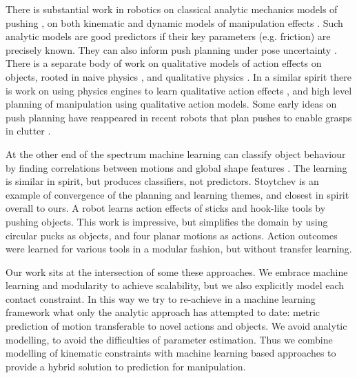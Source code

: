 There is substantial work in robotics on classical analytic mechanics models of pushing \cite{mason_manipulator_1982,lynch_mechanics_1992,peshkin_motion_1988,cappelleri_designing_2006}, on both kinematic and dynamic models of manipulation effects \cite{mason_mechanics_2001}. Such analytic models are good predictors if their key parameters (e.g. friction) are precisely known. They can also inform push planning under pose uncertainty \cite{brost1985planning}. There is a separate body of work on qualitative models of action effects on objects, rooted in naive physics \cite{hayes1995second}, and qualitative physics \cite{kuipers1986qualitative}. In a similar spirit there is work on using physics engines to learn qualitative action effects \cite{Mugan-tamd-12}, and high level planning of manipulation \cite{stillman08ijrr,roy2004mental} using qualitative action models. Some early ideas on push planning have reappeared in recent robots that plan pushes to enable grasps in clutter \cite{Dogar_2010}.

At the other end of the spectrum machine learning can classify object behaviour by finding correlations between motions and global shape features \cite{fitzpatrick_learning_2003,ridge2010self}. The learning is similar in spirit, but produces classifiers, not predictors. Stoytchev \cite{Stoytchev_affordances_2008} is an example of convergence of the planning and learning themes, and closest in spirit overall to ours. A robot learns action effects of sticks and hook-like tools by pushing objects. This work is impressive, but simplifies the domain by using circular pucks as objects, and four planar motions as actions. Action outcomes were learned for various tools in a modular fashion, but without transfer learning.  

Our work sits at the intersection of some these approaches. We embrace machine learning and modularity to achieve scalability, but we also explicitly model each contact constraint. In this way we try to re-achieve in a machine learning framework what only the analytic approach has attempted to date: metric prediction of motion transferable to novel actions and objects. We avoid analytic modelling, to avoid the difficulties of parameter estimation. Thus we combine modelling of kinematic constraints with machine learning based approaches to provide a hybrid solution to prediction for manipulation.